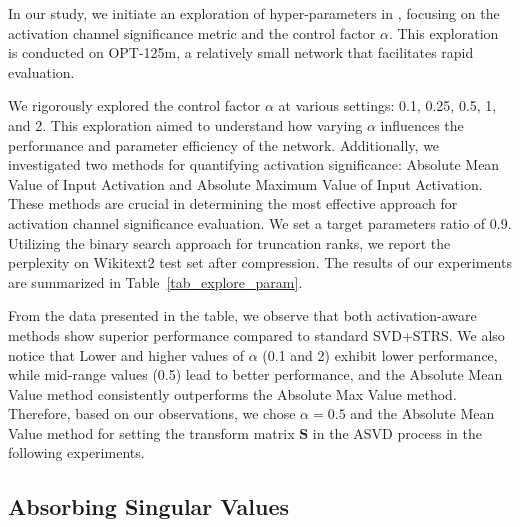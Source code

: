 In our study, we initiate an exploration of hyper-parameters in \asvd, focusing on the activation channel significance metric and the control factor $\alpha$. This exploration is conducted on OPT-125m, a relatively small network that facilitates rapid evaluation.

We rigorously explored the control factor $\alpha$ at various settings: 0.1, 0.25, 0.5, 1, and 2. This exploration aimed to understand how varying $\alpha$ influences the performance and parameter efficiency of the network. Additionally, we investigated two methods for quantifying activation significance: Absolute Mean Value of Input Activation and Absolute Maximum Value of Input Activation. These methods are crucial in determining the most effective approach for activation channel significance evaluation.
We set a target parameters ratio of 0.9. Utilizing the binary search approach for truncation ranks, we report the perplexity on Wikitext2 test set after compression. The results of our experiments are summarized in Table~\ref{tab_explore_param}. 

From the data presented in the table, we observe that both activation-aware methods show superior performance compared to standard SVD+STRS.
We also notice that Lower and higher values of $\alpha$ (0.1 and 2) exhibit lower performance, while mid-range values (0.5) lead to better performance, and the Absolute Mean Value method consistently outperforms the Absolute Max Value method.
Therefore, based on our observations, we chose $\alpha=0.5$ and the Absolute Mean Value method for setting the transform matrix $\mathbf{S}$ in the ASVD process in the following experiments.

\subsection{Absorbing Singular Values}
\label{sec_efficeint_inference}

\begin{table}[!h]
\centering
\caption{Perplexity on Wikitext-2 under different absorbing strategies after \asvd~on OPT-125m.}
\label{tab_fusion}
\end{table}

